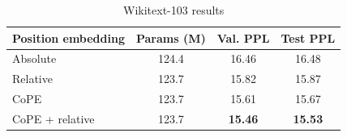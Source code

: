 \documentclass{article}
\newcommand{\ours}{CoPE\xspace}
\begin{document}
\begin{table}[t]
  \caption{Wikitext-103 results}
  \label{tab:wiki}
  \centering
  \begin{tabular}{lccc}
    \toprule
    Position embedding   &  Params (M) & Val. PPL & Test PPL     \\
    \midrule
    Absolute & 124.4 & 16.46 & 16.48 \\
    Relative & 123.7 & 15.82 & 15.87 \\
    \ours & 123.7 & 15.61 & 15.67 \\
    \ours{} + relative & 123.7 & \bf 15.46 & \bf 15.53 \\
    \bottomrule
  \end{tabular}
\end{table}
\fi 
\end{document}
